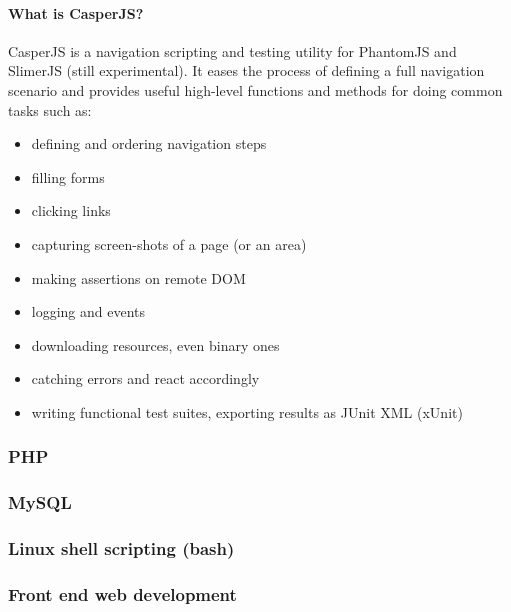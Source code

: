 \documentclass{article}
\begin{document}
\paragraph{What is CasperJS?}
CasperJS is a navigation scripting and testing utility for PhantomJS and SlimerJS (still experimental). It eases the process of defining a full navigation scenario and provides useful high-level functions and methods for doing common tasks such as:
\begin{itemize}
	\item defining and ordering navigation steps
	\item filling forms
	\item clicking links
	\item capturing screen-shots of a page (or an area)
	\item making assertions on remote DOM
	\item logging and events
	\item downloading resources, even binary ones
	\item catching errors and react accordingly
	\item writing functional test suites, exporting results as JUnit XML (xUnit)
\end{itemize}
\begin{center}
	
\end{center}

\subsubsection{PHP}
\subsubsection{MySQL}
\subsubsection{Linux shell scripting (bash)}
\subsubsection{Front end web development}
\end{document}

